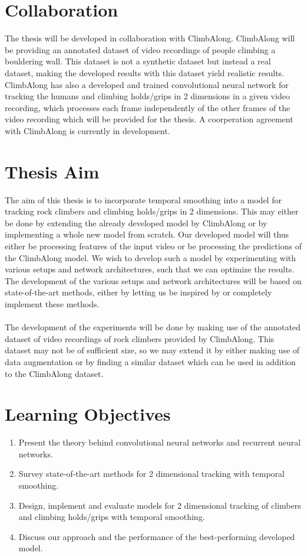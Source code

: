\documentclass[11pt]{article}
\begin{document}
\section{Collaboration}
\label{sec:collab}
The thesis will be developed in collaboration with ClimbAlong. ClimbAlong will be providing an annotated dataset of video recordings of people climbing a bouldering wall. This dataset is not a synthetic dataset but instead a real dataset, making the developed results with this dataset yield realistic results. ClimbAlong has also a developed and trained convolutional neural network for tracking the humans and climbing holds/grips in 2 dimensions in a given video recording, which processes each frame independently of the other frames of the video recording which will be provided for the thesis. A coorperation agreement with ClimbAlong is currently in development.

\section{Thesis Aim}
The aim of this thesis is to incorporate temporal smoothing into a model for tracking rock climbers and climbing holds/grips in 2 dimensions. This may either be done by extending the already developed model by ClimbAlong or by implementing a whole new model from scratch. Our developed model will thus either be processing features of the input video or be processing the predictions of the ClimbAlong model. We wish to develop such a model by experimenting with various setups and network architectures, such that we can optimize the results. The development of the various setups and network architectures will be based on state-of-the-art methods, either by letting us be inspired by or completely implement these methods.
\\
\\
The development of the experiments will be done by making use of the annotated dataset of video recordings of rock climbers provided by ClimbAlong. This dataset may not be of sufficient size, so we may extend it by either making use of data augmentation or by finding a similar dataset which can be used in addition to the ClimbAlong dataset.


\section{Learning Objectives}
\begin{enumerate}
  \item Present the theory behind convolutional neural networks and recurrent neural networks.
  \item Survey state-of-the-art methods for 2 dimensional tracking with temporal smoothing.
  \item Design, implement and evaluate models for 2 dimensional tracking of climbers and climbing holds/grips with temporal smoothing.
  \item Discuss our approach and the performance of the best-performing developed model.
\end{enumerate}

%
\end{document}
